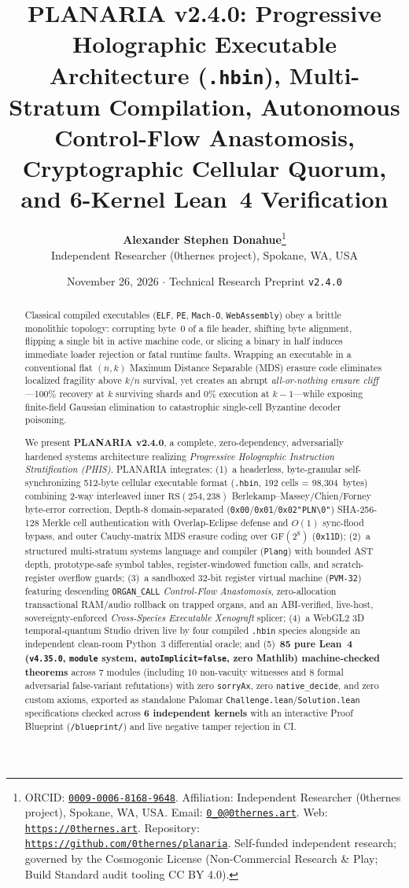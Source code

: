 \documentclass[11pt,letterpaper]{article}
\title{\vspace{-1.0em}\textbf{PLANARIA v2.4.0: Progressive Holographic Executable Architecture (\texttt{.hbin}), Multi-Stratum Compilation, Autonomous Control-Flow Anastomosis, Cryptographic Cellular Quorum, and 6-Kernel Lean~4 Verification}}
\author{%
  \textbf{Alexander Stephen Donahue}\thanks{%
    ORCID: \href{https://orcid.org/0009-0006-8168-9648}{\texttt{0009-0006-8168-9648}}.
    Affiliation: Independent Researcher (0thernes project), Spokane, WA, USA.
    Email: \href{mailto:0_0@0thernes.art}{\texttt{0\_0@0thernes.art}}.
    Web: \href{https://0thernes.art}{\texttt{https://0thernes.art}}.
    Repository: \href{https://github.com/0thernes/planaria}{\texttt{https://github.com/0thernes/planaria}}.
    Self-funded independent research; governed by the Cosmogonic License (Non-Commercial Research \& Play; Build Standard audit tooling CC BY 4.0).
  }\\
  \small Independent Researcher (0thernes project), Spokane, WA, USA
}
\date{November 26, 2026 \quad $\cdot$ \quad Technical Research Preprint \texttt{v2.4.0}}
\theoremstyle{remark}
\begin{document}
\maketitle
\thispagestyle{plain}

\begin{abstract}
Classical compiled executables (\texttt{ELF}, \texttt{PE}, \texttt{Mach-O}, \texttt{WebAssembly}) obey a brittle monolithic topology: corrupting byte~0 of a file header, shifting byte alignment, flipping a single bit in active machine code, or slicing a binary in half induces immediate loader rejection or fatal runtime faults. Wrapping an executable in a conventional flat $(n,k)$ Maximum Distance Separable (MDS) erasure code eliminates localized fragility above $k/n$ survival, yet creates an abrupt \emph{all-or-nothing erasure cliff}---100\% recovery at $k$ surviving shards and 0\% execution at $k-1$---while exposing finite-field Gaussian elimination to catastrophic single-cell Byzantine decoder poisoning.

We present \textbf{PLANARIA v2.4.0}, a complete, zero-dependency, adversarially hardened systems architecture realizing \emph{Progressive Holographic Instruction Stratification (PHIS)}. PLANARIA integrates: (1)~a headerless, byte-granular self-synchronizing 512-byte cellular executable format (\texttt{.hbin}, 192 cells = 98,304~bytes) combining 2-way interleaved inner $\mathrm{RS}(254,238)$ Berlekamp--Massey/\allowbreak Chien/\allowbreak Forney byte-error correction, Depth-8 domain-separated (\texttt{0x00}/\allowbreak\texttt{0x01}/\allowbreak\texttt{0x02\textbar\textbar "PLN\textbackslash 0"}) SHA-256-128 Merkle cell authentication with Overlap-Eclipse defense and $O(1)$ sync-flood bypass, and outer Cauchy-matrix MDS erasure coding over $\mathrm{GF}(2^8)$ (\texttt{0x11D}); (2)~a structured multi-stratum systems language and compiler (\texttt{Plang}) with bounded AST depth, prototype-safe symbol tables, register-windowed function calls, and scratch-register overflow guards; (3)~a sandboxed 32-bit register virtual machine (\texttt{PVM-32}) featuring descending \texttt{ORGAN\_\allowbreak CALL} \emph{Control-Flow Anastomosis}, zero-allocation transactional RAM/audio rollback on trapped organs, and an ABI-verified, live-host, sovereignty-enforced \emph{Cross-Species Executable Xenograft} splicer; (4)~a WebGL2 3D temporal-quantum Studio driven live by four compiled \texttt{.hbin} species alongside an independent clean-room Python~3 differential oracle; and (5)~\textbf{85 pure Lean~4 (\texttt{v4.35.0}, \texttt{module} system, \texttt{autoImplicit=false}, zero Mathlib) machine-checked theorems} across 7 modules (including 10 non-vacuity witnesses and 8 formal adversarial false-variant refutations) with zero \texttt{sorryAx}, zero \texttt{native\_\allowbreak decide}, and zero custom axioms, exported as standalone Palomar \texttt{Challenge.lean}/\allowbreak\texttt{Solution.lean} specifications checked across \textbf{6 independent kernels} with an interactive Proof Blueprint (\texttt{/blueprint/}) and live negative tamper rejection in CI.


\end{abstract}
\end{document}
